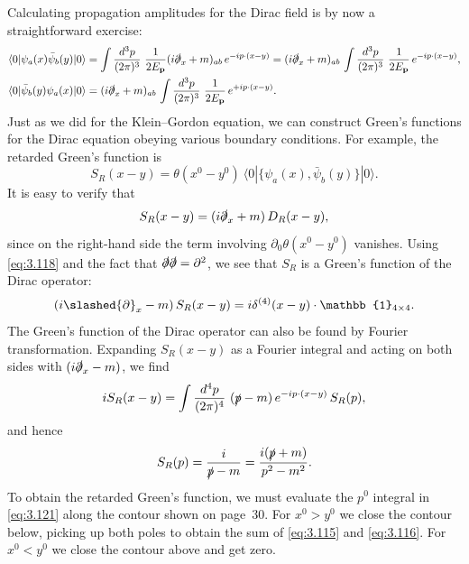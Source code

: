 Calculating propagation amplitudes for the Dirac field is by now a
straightforward exercise:
\begin{align}
  \langle 0|\psi_a(x)\bar{\psi}_b(y)|0\rangle
  &= \int \frac{d^3p}{(2\pi)^3}\ \frac{1}{2E_{\mathbf{p}}}
    (i\slashed{\partial}_x + m)_{ab}\, e^{-ip\cdot(x-y)}
  = (i\slashed{\partial}_x + m)_{ab}\,
    \int \frac{d^3p}{(2\pi)^3}\ \frac{1}{2E_{\mathbf{p}}}\,
    e^{-ip\cdot(x-y)} ,
  \label{eq:3.115}\\
  \langle 0|\bar{\psi}_b(y)\psi_a(x)|0\rangle
  &= (i\slashed{\partial}_x + m)_{ab}\,
    \int \frac{d^3p}{(2\pi)^3}\ \frac{1}{2E_{\mathbf{p}}}\,
    e^{+ip\cdot(x-y)} .
  \label{eq:3.116}
\end{align}
Just as we did for the Klein--Gordon equation, we can construct Green's
functions for the Dirac equation obeying various boundary conditions.  For
example, the retarded Green's function is
\begin{equation}
  S_R(x-y) = \theta(x^0-y^0)\ \langle 0|\{\psi_a(x), \bar{\psi}_b(y)\}|0\rangle .
  \label{eq:3.117}
\end{equation}
It is easy to verify that
\begin{equation}
  S_R(x-y) = (i\slashed{\partial}_x + m)\,D_R(x-y),
  \label{eq:3.118}
\end{equation}
since on the right-hand side the term involving
$\partial_0\theta(x^0-y^0)$ vanishes.  Using \eqref{eq:3.118} and the fact
that $\slashed{\partial}\slashed{\partial} = \partial^2$, we see that $S_R$
is a Green's function of the Dirac operator:
\begin{equation}
  (i\slashed{\partial}_x - m)\,S_R(x-y) = i\delta^{(4)}(x-y)\cdot
    \mathbb{1}_{4\times4} .
  \label{eq:3.119}
\end{equation}
The Green's function of the Dirac operator can also be found by Fourier
transformation.  Expanding $S_R(x-y)$ as a Fourier integral and acting on
both sides with $(i\slashed{\partial}_x - m)$, we find
\begin{equation}
  iS_R(x-y) = \int \frac{d^4p}{(2\pi)^4}\ (\slashed{p} - m)\,
    e^{-ip\cdot(x-y)}\, S_R(p),
  \label{eq:3.120}
\end{equation}
and hence
\begin{equation}
  S_R(p) = \frac{i}{\slashed{p} - m}
    = \frac{i(\slashed{p} + m)}{p^2 - m^2} .
  \label{eq:3.121}
\end{equation}
To obtain the retarded Green's function, we must evaluate the $p^0$ integral
in \eqref{eq:3.121} along the contour shown on page~30.  For $x^0>y^0$ we
close the contour below, picking up both poles to obtain the sum of
\eqref{eq:3.115} and \eqref{eq:3.116}.  For $x^0<y^0$ we close the contour
above and get zero.

